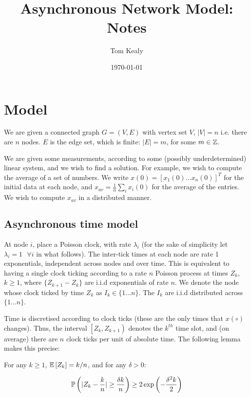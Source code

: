 \documentclass{article}
\begin{document}
\nocite{*}
\title{Asynchronous Network Model: Notes}
\date{\today}
\author{Tom Kealy}
\maketitle

\section{Model}
We are given a connected graph \( G = \left(V,E\right) \) with vertex set \(V\), \(|V| = n\) i.e. there are \(n\) nodes. \(E\) is the edge set, which is finite: \(|E| = m\), for some \(m \in {\mathbb{Z}} \).

We are given some measurements, according to some (possibly underdetermined) linear system, and we wish to find a solution. For example, we wish to compute the average of a set of numbers. We write \(x\left(0\right) = \left[x_1\left(0\right)\ldots x_n\left(0\right)\right]^T\) for the initial data at each node, and \(x_{av} = \frac{1}{n}\sum_i x_i\left(0\right)\) for the average of the entries. We wish to compute \(x_{av}\) in a distributed manner.

\subsection{Asynchronous time model}
At node \(i\), place a Poisson clock, with rate \(\lambda_i\) (for the sake of simplicity let \(\lambda_i = 1 \text{ } \forall i\) in what follows). The inter-tick times at each node are rate 1 exponentials, independent across nodes and over time. This is equivalent to having a single clock ticking according to a rate \(n\) Poisson process at times \(Z_k\), \(k \geq 1\), where \(\{Z_{k+1} - Z_k\}\) are i.i.d exponentials of rate \(n\). We denote the node whose clock ticked by time \(Z_k\) as \(I_k \in \{1 \ldots n\}\). The \(I_k\) are i.i.d distributed across \(\{1 \ldots n\}\). 

Time is discretised according to clock ticks (these are the only times that \(x\left(\circ\right)\) changes). Thus, the interval \( \left[Z_k, Z_{k+1}\right)\) denotes the \(k^{th}\) time slot, and (on average) there are \(n\) clock ticks per unit of absolute time. The following lemma makes this precise:

\begin{lemma} 
For any \(k \geq 1\), \({\mathbb{E}}\left[Z_k\right] = k/n\), and for any \(\delta > 0\): 

\begin{equation}
{\mathbb{P}}\left(|Z_k - \frac{k}{n}| \geq \frac{\delta k}{n} \right) \geq 2\exp\left(-\frac{\delta^2 k}{2}\right)
\end{equation}
\end{lemma}
\end{document}
